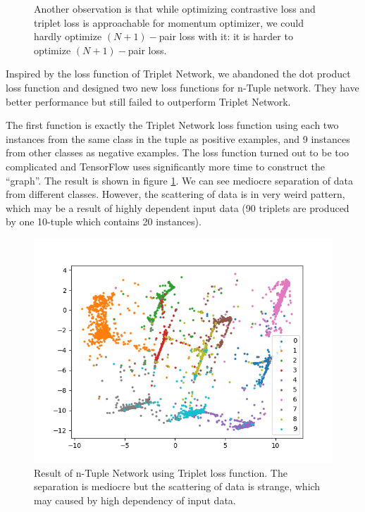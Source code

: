 \documentclass[10pt,twocolumn,letterpaper]{article}
\begin{document}
\begin{figure}[t]
				
				Another observation is that while optimizing contrastive loss and triplet loss is approachable for momentum optimizer, we could hardly optimize $(N+1)-$pair loss with it: it is harder to optimize $(N+1)-$pair loss. 
			\end{figure}
			
			Inspired by the loss function of Triplet Network, we abandoned the dot product loss function and designed two new loss functions for n-Tuple network. They have better performance but still failed to outperform Triplet Network.
			
			The first function is exactly the Triplet Network loss function using each two instances from the same class in the tuple as positive examples, and 9 instances from other classes as negative examples. The loss function turned out to be too complicated and TensorFlow uses significantly more time to construct the ``graph''. The result is shown in figure \ref{fig:first_tuple}. We can see mediocre separation of data from different classes. However, the scattering of data is in very weird pattern, which may be a result of highly dependent input data (90 triplets are produced by one 10-tuple which contains 20 instances). 
			
			\begin{figure}[htbp]
				\begin{center}
					\includegraphics[width=0.9\linewidth]{first_tuple}
				\end{center}
				\caption{Result of n-Tuple Network using Triplet loss function. The separation is mediocre but the scattering of data is strange, which may caused by high dependency of input data.\label{fig:first_tuple}}
			\end{figure}
			
\end{document}
